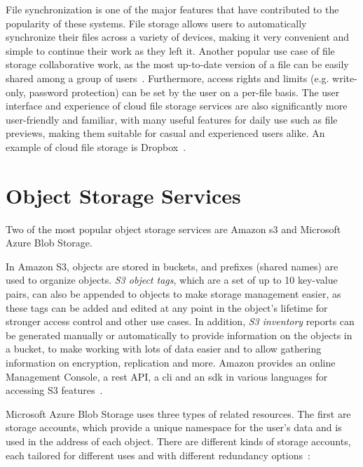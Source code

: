 File synchronization is one of the major features that have contributed to the popularity of these systems. File storage allows users to automatically synchronize their files across a variety of devices, making it very convenient and simple to continue their work as they left it. Another popular use case of file storage collaborative work, as the most up-to-date version of a file can be easily shared among a group of users~\cite{personal1}. Furthermore, access rights and limits (e.g. write-only, password protection) can be set by the user on a per-file basis. The user interface and experience of cloud file storage services are also significantly more user-friendly and familiar, with many useful features for daily use such as file previews, making them suitable for casual and experienced users alike. An example of cloud file storage is Dropbox~\cite{dropbox}.


\section{Object Storage Services}
Two of the most popular object storage services are Amazon \ac{s3} and Microsoft Azure Blob Storage.

In Amazon S3, objects are stored in buckets, and prefixes (shared names) are used to organize objects. \textit{S3 object tags}, which are a set of up to 10 key-value pairs, can also be appended to objects to make storage management easier, as these tags can be added and edited at any point in the object's lifetime for stronger access control and other use cases. In addition, \textit{S3 inventory} reports can be generated manually or automatically to provide information on the objects in a bucket, to make working with lots of data easier and to allow gathering information on encryption, replication and more. Amazon provides an online Management Console, a \ac{rest} API, a \ac{cli} and an \ac{sdk} in various languages for accessing S3 features~\cite{s3faq}.

Microsoft Azure Blob Storage uses three types of related resources. The first are storage accounts, which provide a unique namespace for the user's data and is used in the address of each object. There are different kinds of storage accounts, each tailored for different uses and with different redundancy options~\cite{blobaccounts}:

